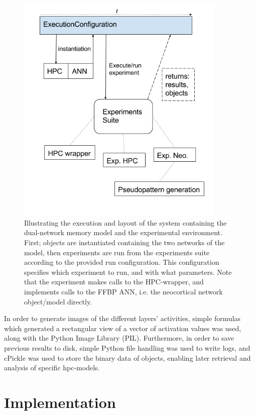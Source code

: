 \begin{figure}
    \centering
    \includegraphics[width=10cm]{fig/ExecutionConfiguration.png}
    \caption{Illustrating the execution and layout of the system containing the dual-network memory model and the experimental environment. First; objects are instantiated containing the two networks of the model, then experiments are run from the experiments suite according to the provided run configuration. This configuration specifies which experiment to run, and with what parameters. Note that the experiment makes calls to the HPC-wrapper, and implements calls to the FFBP ANN, i.e. the neocortical network object/model directly.}
    \label{fig:system_layout}
\end{figure}

In order to generate images of the different layers' activities, simple formulas which generated a rectangular view of a vector of activation values was used, along with the Python Image Library (PIL). Furthermore, in order to save previous results to disk, simple Python file handling was used to write logs, and cPickle was used to store the binary data of objects, enabling later retrieval and analysis of specific hpc-models.

\section{Implementation}

